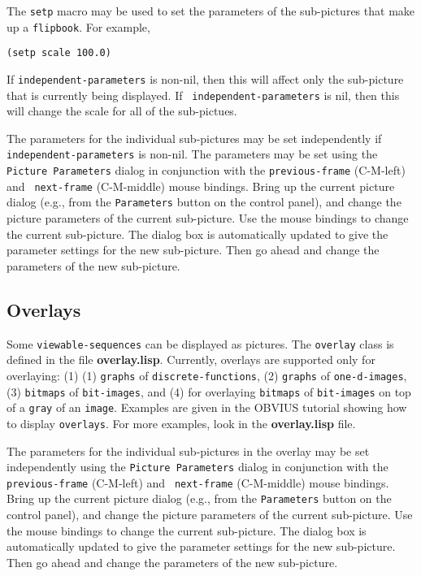 The {\tt setp} macro may be used to set the parameters of the
sub-pictures that make up a {\tt flipbook}.  For example, 
\begin{verbatim}
(setp scale 100.0)
\end{verbatim}
If {\tt independent-parameters} is non-nil, then this will affect only
the sub-picture that is currently being displayed.  If {\tt
independent-parameters} is nil, then this will change the scale for
all of the sub-pictues.

The parameters for the individual sub-pictures may be set
independently if {\tt independent-parameters} is non-nil.  The
parameters may be set using the {\tt Picture Parameters} dialog in
conjunction with the {\tt previous-frame} (C-M-left) and {\tt
next-frame} (C-M-middle) mouse bindings.  Bring up the current picture
dialog (e.g., from the {\tt Parameters} button on the control panel),
and change the picture parameters of the current sub-picture.  Use the
mouse bindings to change the current sub-picture.  The dialog box is
automatically updated to give the parameter settings for the new
sub-picture.  Then go ahead and change the parameters of the new
sub-picture.


\subsection{Overlays}
\label{sec:overlays}

Some {\tt viewable-sequences} can be displayed as 
pictures.  The {\tt overlay} class is defined in the file {\bf
overlay.lisp}.  Currently, overlays are supported only for overlaying:
(1) (1) {\tt graphs} of {\tt discrete-functions}, (2) {\tt graphs} of
{\tt one-d-images}, (3) {\tt bitmaps} of {\tt bit-images}, and (4) for
overlaying {\tt bitmaps} of {\tt bit-images} on top of a {\tt gray} of
an {\tt image}.  Examples are given in the OBVIUS tutorial showing how
to display {\tt overlays}.  For more examples, look in the {\bf
overlay.lisp} file.

The parameters for the individual sub-pictures in the overlay may be
set independently using the {\tt Picture Parameters} dialog in
conjunction with the {\tt previous-frame} (C-M-left) and {\tt
next-frame} (C-M-middle) mouse bindings.  Bring up the current picture
dialog (e.g., from the {\tt Parameters} button on the control panel),
and change the picture parameters of the current sub-picture.  Use the
mouse bindings to change the current sub-picture.  The dialog box is
automatically updated to give the parameter settings for the new
sub-picture.  Then go ahead and change the parameters of the new
sub-picture.

